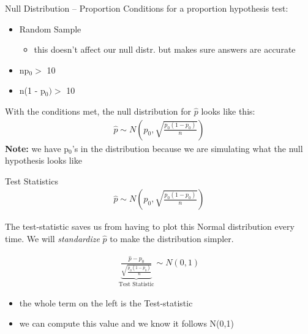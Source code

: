 \documentclass{beamer}
\begin{document}
\begin{frame}{Null Distribution -- Proportion}
Conditions for a proportion hypothesis test:
\begin{itemize}
    \item Random Sample
    \begin{itemize}
        \item this doesn't affect our null distr. but makes sure answers are accurate
    \end{itemize}
    \item np$_0 >$ 10
    \item n(1 - p$_0) >$ 10
\end{itemize} \vspace{4mm}

With the conditions met, the null distribution for $\widehat{p}$ looks like this:
\begin{align*}
    \widehat{p} \sim N(p_0, \sqrt{\frac{p_0(1 - p_0)}{n}})
\end{align*}
\textbf{Note:} we have p$_0$'s in the distribution because we are simulating what the null hypothesis looks like
\end{frame}

\begin{frame}{Test Statistics}
\begin{align*}
    \widehat{p} \sim N(p_0, \sqrt{\frac{p_0(1 - p_0)}{n}})
\end{align*}

The test-statistic saves us from having to plot this Normal distribution every time. We will \textit{standardize} $\hat{p}$ to make the distribution simpler.

\begin{align*}
    \underbrace{\frac{\widehat{p}-p_0}{\sqrt{\frac{p_0(1 - p_0)}{n}}}}_{\text{Test Statistic}} \sim N(0,1)
\end{align*}
\begin{itemize}
    \item the whole term on the left is the Test-statistic
    \item we can compute this value and we know it follows N(0,1)
\end{itemize}
\end{frame}
\end{document}

